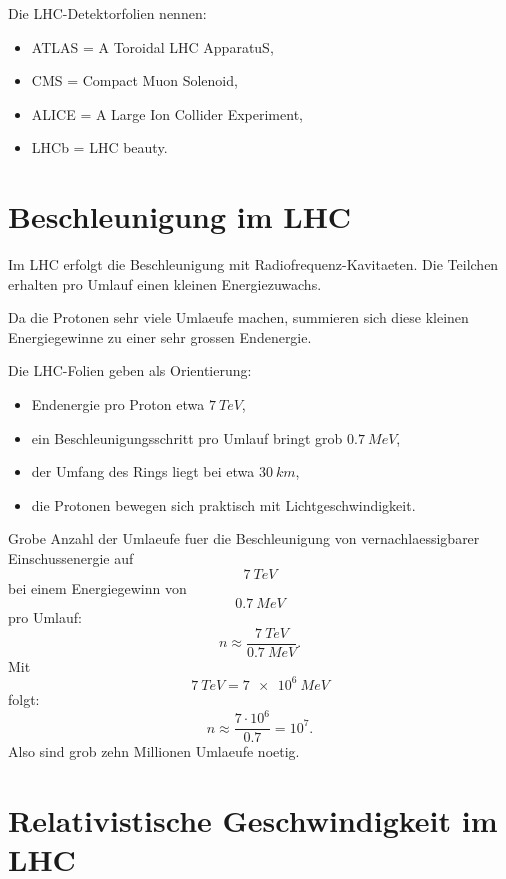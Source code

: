 \begin{notebox}
Die LHC-Detektorfolien nennen:
\begin{itemize}
    \item ATLAS = A Toroidal LHC ApparatuS,
    \item CMS = Compact Muon Solenoid,
    \item ALICE = A Large Ion Collider Experiment,
    \item LHCb = LHC beauty.
\end{itemize}
\end{notebox}

\section{Beschleunigung im LHC}

\begin{conceptbox}
Im LHC erfolgt die Beschleunigung mit Radiofrequenz-Kavitaeten.
Die Teilchen erhalten pro Umlauf einen kleinen Energiezuwachs.

Da die Protonen sehr viele Umlaeufe machen, summieren sich diese kleinen
Energiegewinne zu einer sehr grossen Endenergie.
\end{conceptbox}

\begin{notebox}
Die LHC-Folien geben als Orientierung:
\begin{itemize}
    \item Endenergie pro Proton etwa $\SI{7}{TeV}$,
    \item ein Beschleunigungsschritt pro Umlauf bringt grob $\SI{0.7}{MeV}$,
    \item der Umfang des Rings liegt bei etwa $\SI{30}{km}$,
    \item die Protonen bewegen sich praktisch mit Lichtgeschwindigkeit.
\end{itemize}
\end{notebox}

\begin{calculationbox}
Grobe Anzahl der Umlaeufe fuer die Beschleunigung von vernachlaessigbarer
Einschussenergie auf
\[
    \SI{7}{TeV}
\]
bei einem Energiegewinn von
\[
    \SI{0.7}{MeV}
\]
pro Umlauf:
\[
    n
    \approx
    \frac{\SI{7}{TeV}}{\SI{0.7}{MeV}}.
\]
Mit
\[
    \SI{7}{TeV}=\SI{7e6}{MeV}
\]
folgt:
\[
    n
    \approx
    \frac{7\cdot 10^6}{0.7}
    =
    10^7.
\]
Also sind grob zehn Millionen Umlaeufe noetig.
\end{calculationbox}

\section{Relativistische Geschwindigkeit im LHC}

